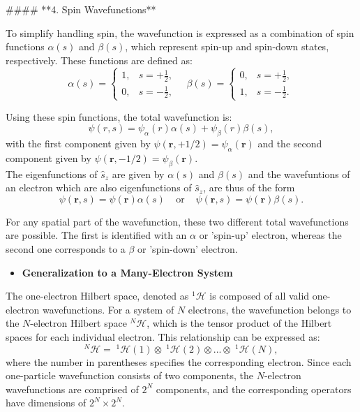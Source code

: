 \documentclass[%
 preprint, linenumbers,
 amsmath,amssymb,
 aps, physrev,
]{revtex4-2}
\begin{document}
#### **4. Spin Wavefunctions**

To simplify handling spin, the wavefunction is expressed as a combination of spin functions \( \alpha(s) \) and \( \beta(s) \), which represent spin-up and spin-down states, respectively. These functions are defined as:
\[
\alpha(s) = 
\begin{cases} 
1, & s = +\frac{1}{2}, \\
0, & s = -\frac{1}{2}, 
\end{cases}
\quad
\beta(s) = 
\begin{cases} 
0, & s = +\frac{1}{2}, \\
1, & s = -\frac{1}{2}.
\end{cases}
\]

Using these spin functions, the total wavefunction is:
\[
\psi(r, s) = \psi_\alpha(r) \alpha(s) + \psi_\beta(r) \beta(s),
\]
with the first component given by $\psi(\mathbf{r}, +1/2) = \psi_{\alpha}(\mathbf{r})$ and the second component given by $\psi(\mathbf{r}, -1/2) = \psi_{\beta}(\mathbf{r})$.\\

The eigenfunctions of $\hat{s}_z$ are given by $\alpha(s)$ and $\beta(s)$ and the wavefuntions of an electron which are also eigenfunctions of $\hat{s}_z$, are thus of the form
\begin{equation}
    \psi(\mathbf{r},s) = \psi(\mathbf{r})\alpha(s) \; \; \; \; \text{or} \; \; \; \; \psi(\mathbf{r},s) = \psi(\mathbf{r})\beta(s).
\end{equation}

For any spatial part of the wavefunction, these two different total wavefunctions are possible. The first is identified with an $\alpha$ or 'spin-up' electron, whereas the second one corresponds to a $\beta$ or 'spin-down' electron.\\

\begin{itemize}
     \item \textbf{Generalization to a Many-Electron System}
\end{itemize}

The one-electron Hilbert space, denoted as $^1\mathcal{H}$  is composed of all valid one-electron wavefunctions. For a system of $N$ electrons, the wavefunction belongs to the $N$-electron Hilbert space $^N\mathcal{H}$, which is the tensor product of the Hilbert spaces for each individual electron. This relationship can be expressed as:
\begin{equation}
    ^N\mathcal{H} =\;^1\mathcal{H}(1)\otimes\;^1\mathcal{H}(2)\otimes...\otimes\;^1\mathcal{H}(N), 
\end{equation}
where the number in parentheses specifies the corresponding electron. Since each one-particle wavefunction consists of two components, the $N$-electron wavefunctions are comprised of $2^N$ components, and the corresponding operators have dimensions of $2^N \times 2^N$.\\
\end{document}
